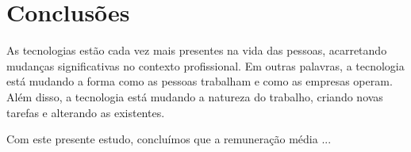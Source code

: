 \section{Conclusões}

As tecnologias estão cada vez mais presentes na vida das pessoas, acarretando mudanças significativas no contexto profissional. Em outras palavras, a tecnologia está mudando a forma como as pessoas trabalham e como as empresas operam. Além disso, a tecnologia está mudando a natureza do trabalho, criando novas tarefas e alterando as existentes.

Com este presente estudo, concluímos que a remuneração média ...
